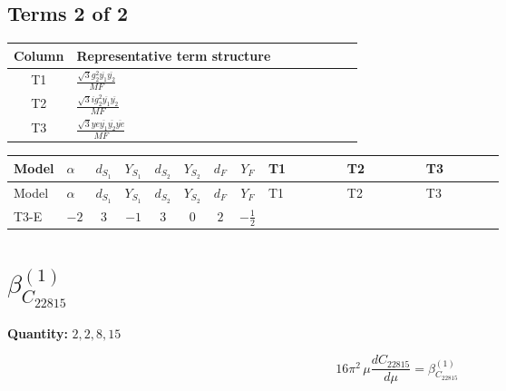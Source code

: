 \documentclass[8pt]{article}
\begin{document}
\begin{landscape}
\subsection*{Terms 2 of 2}
\begin{center}
\begin{tabular}{@{}c >{\raggedright\arraybackslash}p{0.82\linewidth}@{}}
\toprule
Column & Representative term structure \\
\midrule
T1 & \(\displaystyle \frac{\sqrt{3} g_{2}^{2} \overline{y_{1}} \overline{y_{2}}}{MF}\) \\
\midrule
T2 & \(\displaystyle \frac{\sqrt{3} i g_{2}^{2} \overline{y_{1}} \overline{y_{2}}}{MF}\) \\
\midrule
T3 & \(\displaystyle \frac{\sqrt{3} ye \overline{y_{1}} \overline{y_{2}} \overline{ye}}{MF}\) \\
\midrule
\bottomrule
\end{tabular}
\end{center}
\smallskip
\tiny
\begin{longtable}{@{}llcccccc >{\raggedright\arraybackslash}p{0.21\linewidth} >{\raggedright\arraybackslash}p{0.21\linewidth} >{\raggedright\arraybackslash}p{0.21\linewidth}@{}}
\toprule
Model & $\alpha$ & $d_{S_1}$ & $Y_{S_1}$ & $d_{S_2}$ & $Y_{S_2}$ & $d_F$ & $Y_F$ & T1 & T2 & T3 \\
\midrule
\endfirsthead
\toprule
Model & $\alpha$ & $d_{S_1}$ & $Y_{S_1}$ & $d_{S_2}$ & $Y_{S_2}$ & $d_F$ & $Y_F$ & T1 & T2 & T3 \\
\midrule
\endhead
T3-E & $-2$ & $3$ & $-1$ & $3$ & $0$ & $2$ & $-\frac{1}{2}$ & \scriptsize\adjustbox{max width=\linewidth}{$\begin{gathered} \frac{11 \sqrt{3} g_{2}^{2} \overline{y_{1}} \overline{y_{2}}}{8 MF}\end{gathered}$} & \scriptsize\adjustbox{max width=\linewidth}{$\begin{gathered} - \frac{\sqrt{3} i g_{2}^{2} \overline{y_{1}} \overline{y_{2}}}{6 MF}\end{gathered}$} & \scriptsize\adjustbox{max width=\linewidth}{$\begin{gathered} - \frac{\sqrt{3} ye \overline{y_{1}} \overline{y_{2}} \overline{ye}}{12 MF}\end{gathered}$} \\
\midrule
\bottomrule
\end{longtable}
\clearpage
\section*{$\beta_{C_{22815}}^{(1)}$}
\noindent\textbf{Quantity: }$\mathrm{2,2,8,15}$\par\smallskip
\[16\pi^2\,\mu\frac{d C_{22815}}{d\mu}=\beta_{C_{22815}}^{(1)}\]

\end{landscape}
\end{document}
